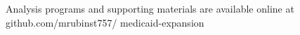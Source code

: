 \documentclass[article]{imsart}
\theoremstyle{plain}
\theoremstyle{remark}
\begin{document}
\begin{supplement}
Analysis programs and supporting materials are available online at github.com/mrubinst757/ medicaid-expansion
\end{supplement}


\begin{appendix}











\end{appendix}
\end{document}
